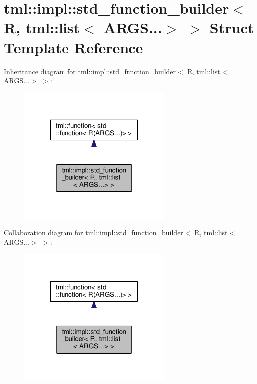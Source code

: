 \hypertarget{structtml_1_1impl_1_1std__function__builder_3_01_r_00_01tml_1_1list_3_01_a_r_g_s_8_8_8_4_01_4}{\section{tml\+:\+:impl\+:\+:std\+\_\+function\+\_\+builder$<$ R, tml\+:\+:list$<$ A\+R\+G\+S...$>$ $>$ Struct Template Reference}
\label{structtml_1_1impl_1_1std__function__builder_3_01_r_00_01tml_1_1list_3_01_a_r_g_s_8_8_8_4_01_4}
}


Inheritance diagram for tml\+:\+:impl\+:\+:std\+\_\+function\+\_\+builder$<$ R, tml\+:\+:list$<$ A\+R\+G\+S...$>$ $>$\+:
\nopagebreak
\begin{figure}[H]
\begin{center}
\leavevmode
\includegraphics[width=212pt]{structtml_1_1impl_1_1std__function__builder_3_01_r_00_01tml_1_1list_3_01_a_r_g_s_8_8_8_4_01_4__inherit__graph}
\end{center}
\end{figure}


Collaboration diagram for tml\+:\+:impl\+:\+:std\+\_\+function\+\_\+builder$<$ R, tml\+:\+:list$<$ A\+R\+G\+S...$>$ $>$\+:
\nopagebreak
\begin{figure}[H]
\begin{center}
\leavevmode
\includegraphics[width=212pt]{structtml_1_1impl_1_1std__function__builder_3_01_r_00_01tml_1_1list_3_01_a_r_g_s_8_8_8_4_01_4__coll__graph}
\end{center}
\end{figure}
